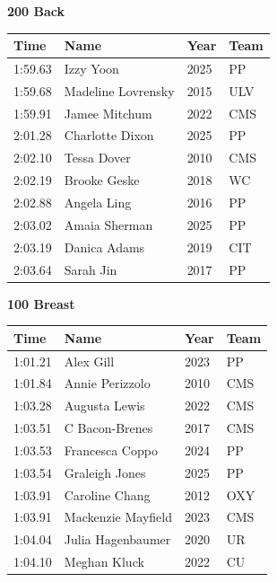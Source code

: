 \vspace{1.2em}
\noindent\begin{minipage}[t]{0.98\textwidth}
\centering
\textbf{\textcolor{teamprimary}{200 Back}}\par
\vspace{0.5em}
\centering
\small
\renewcommand{\arraystretch}{1.0}
\setlength{\tabcolsep}{4pt}
\begin{tabular}{@{}p{2.5cm}p{4.5cm}p{1.5cm}p{2.5cm}@{}}
\toprule
\textbf{Time} & \textbf{Name} & \textbf{Year} & \textbf{Team} \\
\midrule
1:59.63 & Izzy Yoon & 2025 & PP \\
1:59.68 & Madeline Lovrensky & 2015 & ULV \\
1:59.91 & Jamee Mitchum & 2022 & CMS \\
2:01.28 & Charlotte Dixon & 2025 & PP \\
2:02.10 & Tessa Dover & 2010 & CMS \\
2:02.19 & Brooke Geske & 2018 & WC \\
2:02.88 & Angela Ling & 2016 & PP \\
2:03.02 & Amaia Sherman & 2025 & PP \\
2:03.19 & Danica Adams & 2019 & CIT \\
2:03.64 & Sarah Jin & 2017 & PP \\
\bottomrule
\end{tabular}
\end{minipage}
\vspace{1.2em}
\noindent\begin{minipage}[t]{0.98\textwidth}
\centering
\textbf{\textcolor{teamprimary}{100 Breast}}\par
\vspace{0.5em}
\centering
\small
\renewcommand{\arraystretch}{1.0}
\setlength{\tabcolsep}{4pt}
\begin{tabular}{@{}p{2.5cm}p{4.5cm}p{1.5cm}p{2.5cm}@{}}
\toprule
\textbf{Time} & \textbf{Name} & \textbf{Year} & \textbf{Team} \\
\midrule
1:01.21 & Alex Gill & 2023 & PP \\
1:01.84 & Annie Perizzolo & 2010 & CMS \\
1:03.28 & Augusta Lewis & 2022 & CMS \\
1:03.51 & C Bacon-Brenes & 2017 & CMS \\
1:03.53 & Francesca Coppo & 2024 & PP \\
1:03.54 & Graleigh Jones & 2025 & PP \\
1:03.91 & Caroline Chang & 2012 & OXY \\
1:03.91 & Mackenzie Mayfield & 2023 & CMS \\
1:04.04 & Julia Hagenbaumer & 2020 & UR \\
1:04.10 & Meghan Kluck & 2022 & CU \\
\bottomrule
\end{tabular}
\end{minipage}
